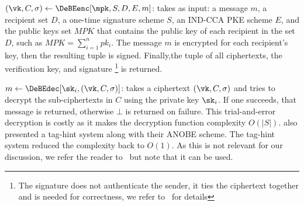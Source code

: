 






\((\vk, C, \sigma)\gets \DeBEenc[\mpk, S, D, E, m]\):
takes as input: a message \(m\), a recipient set \(D\),  a one-time signature
scheme \(S\), an IND-CCA \ac{PKE} scheme \(E\), and the public keys
set \(MPK\) that contains the public key of each recipient in the set
\(D\), such as $MPK=\sum_{i=1}^{n} pk_i$. The message $m$ is encrypted 
for each recipient's key, then the resulting tuple is
signed.  Finally,the tuple of all ciphertexts, the
verification key, and signature \footnote{The signature
does not authenticate the sender, it ties the ciphertext together and
is needed for correctness, we refer to~\cite{ANOBE} for  details} is returned.

\(m\gets \DeBEdec[\sk_i, (\vk, C, \sigma)]\):
takes a ciphertext \((\vk, C, \sigma)\) and tries to decrypt the sub-ciphertexts 
in \(C\) using the private key \(\sk_i\).
If one succeeds, that message is returned, otherwise \(\bot\) is returned on 
failure.
This trial-and-error decryption is costly as it makes the decryption function 
complexity \(O(|S|)\).
\textcite{ANOBE} also presented a tag-hint system along with their \ac{ANOBE} 
scheme.
The tag-hint system reduced the complexity back to \(O(1)\).
As this is not relevant for our discussion, we refer the reader to~\cite{ANOBE} 
but note that it can be used.

